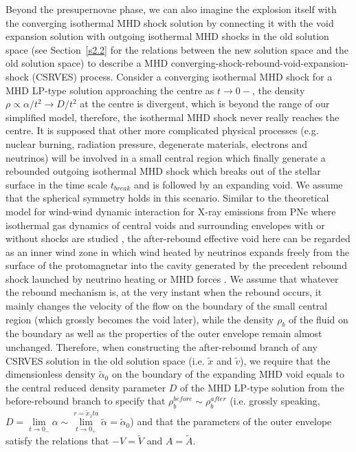 \documentclass[fleqn,usenatbib]{mnras}
\begin{document}
Beyond the presupernovae phase, we can also imagine the explosion itself with the converging isothermal MHD shock solution by connecting it with the void expansion solution with outgoing isothermal MHD shocks in the old solution space (see Section~\ref{s2.2} for the relations between the new solution space and the old solution space) to describe a MHD converging-shock-rebound-void-expansion-shock (CSRVES) process. Consider a converging isothermal MHD shock for a MHD LP-type solution approaching the centre as $t\rightarrow 0{-}$, the density $\rho\propto \alpha/t^{2}\rightarrow D/t^{2}$ at the centre is divergent, which is beyond the range of our simplified model, therefore, the isothermal MHD shock never really reaches the centre. It is supposed that other more complicated physical processes (e.g. nuclear burning, radiation pressure, degenerate materials, electrons and neutrinos) will be involved in a small central region which finally generate a rebounded outgoing isothermal MHD shock which breaks out of the stellar surface in the time scale $t_{break}$ and is followed by an expanding void. We assume that the spherical symmetry holds in this scenario. Similar to the theoretical model for wind-wind dynamic interaction for X-ray emissions from PNe where isothermal gas dynamics of central voids and surrounding envelopes with or without shocks are studied \citep{lou2009dynamic}, the after-rebound effective void here can be regarded as an inner wind zone in which wind heated by neutrinos expands freely from the surface of the protomagnetar into the cavity generated by the precedent rebound shock launched by neutrino heating or MHD forces \citep{Metzger2011}. We assume that whatever the rebound mechanism is, at the very instant when the rebound occurs, it mainly changes the velocity of the flow on the boundary of the small central region (which grossly becomes the void later), while the density $\rho_{b}$ of the fluid on the boundary as well as the properties of the outer envelope remain almost unchanged. Therefore, when constructing the after-rebound branch of any CSRVES solution in the old solution space (i.e. $\widetilde{x}$ and $\widetilde{v}$), we require that the dimensionless density $\widetilde{\alpha}_{0}$ on the boundary of the expanding MHD void equals to the central reduced density parameter $D$ of the MHD LP-type solution from the before-rebound branch to specify that $\rho_{b}^{before}\sim\rho_{b}^{after}$ (i.e. grossly speaking, $D=\lim\limits_{t\rightarrow 0_{-}}\alpha\sim \lim\limits_{t\rightarrow 0_{+}}^{r=\widetilde{x}_{1}ta}\widetilde{\alpha}=\widetilde{\alpha}_{0}$) and that the parameters of the outer envelope satisfy the relations that $-V=\widetilde{V}$ and $A=\widetilde{A}$.
\end{document}
